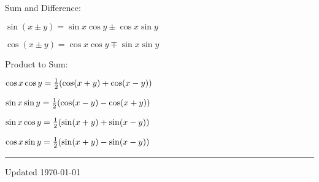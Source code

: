 \documentclass[10pt]{article}
\newcommand{\tab}{\hspace{.02\textwidth}}
\newcommand{\lrb}[1]{\left(#1\right)}
\let\originalleft\left
\let\originalright\right
\renewcommand{\left}{\mathopen{}\mathclose\bgroup\originalleft}
\renewcommand{\right}{\aftergroup\egroup\originalright}
\begin{document}
\begin{multicols*}{3}
Sum and Difference:

\tab $\sin(x\pm y)=\sin x\cos y\pm\cos x\sin y$

\tab $\cos(x\pm y)=\cos x\cos y\mp\sin x\sin y$

Product to Sum:

\tab $\cos x\cos y=\tfrac{1}{2}\lrb{\cos(x+y)+\cos(x-y)}$

\tab $\sin x\sin y=\tfrac{1}{2}\lrb{\cos(x-y)-\cos(x+y)}$

\tab $\sin x\cos y=\tfrac{1}{2}\lrb{\sin(x+y)+\sin(x-y)}$

\tab $\cos x\sin y=\tfrac{1}{2}\lrb{\sin(x+y)-\sin(x-y)}$ 

\rule{\linewidth}{0.1pt}

\scriptsize 
Updated \today

\end{multicols*}
\end{document}
